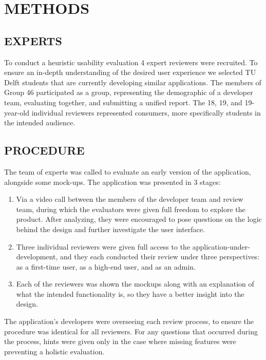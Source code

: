 \section{METHODS}

\subsection{EXPERTS}

To conduct a heuristic usability evaluation 4 expert reviewers were recruited. To ensure an in-depth understanding of the desired user experience we
selected TU Delft students that are currently developing similar applications. The members of Group 46 participated as a group, representing the demographic of a developer team, evaluating together, and submitting a unified report. The 18, 19, and 19-year-old individual reviewers represented consumers, more specifically students in the intended audience.

\subsection{PROCEDURE}
The team of experts was called to evaluate an early version of the application, alongside some mock-ups. The application was presented in 3 stages:
\begin{enumerate}
    \item Via a video call between the members of the developer team and review team, during which the evaluators were given full freedom to explore the product. After analyzing, they were encouraged to pose questions on the logic behind the design and further investigate the user interface.
    \item Three individual reviewers were given full access to the application-under-development, and they each conducted their review under three perspectives: as a first-time user, as a high-end user, and as an admin.
    \item Each of the reviewers was shown the mockups along with an explanation of what the intended functionality is, so they have a better insight into the design.
\end{enumerate}
The application’s developers were overseeing each review process, to ensure the procedure was identical for all reviewers. For any questions that occurred during the process, hints were given only in the case where missing features were preventing a holistic evaluation.

